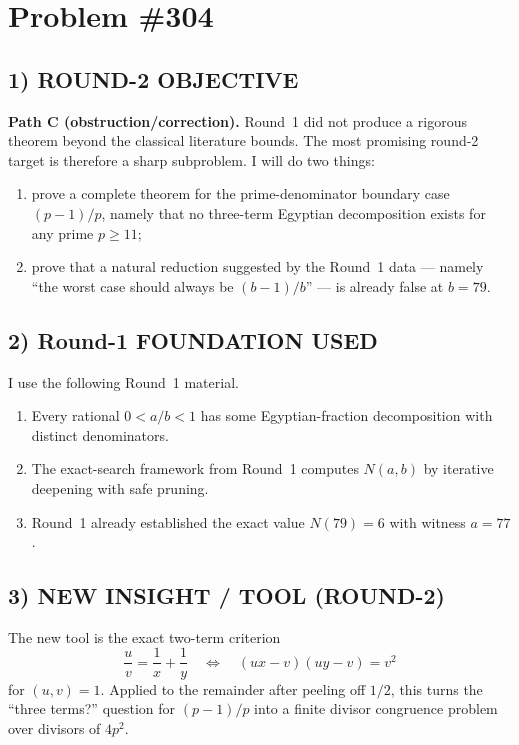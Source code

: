 \section*{Problem \#304}

\subsection*{1) ROUND-2 OBJECTIVE}
\textbf{Path C (obstruction/correction).}
Round~1 did not produce a rigorous theorem beyond the classical literature bounds.
The most promising round-2 target is therefore a sharp subproblem.
I will do two things:
\begin{enumerate}
\item prove a complete theorem for the prime-denominator boundary case \((p-1)/p\), namely that no three-term Egyptian decomposition exists for any prime \(p\ge 11\);
\item prove that a natural reduction suggested by the Round~1 data --- namely ``the worst case should always be \((b-1)/b\)'' --- is already false at \(b=79\).
\end{enumerate}

\subsection*{2) Round-1 FOUNDATION USED}
I use the following Round~1 material.
\begin{enumerate}
\item Every rational \(0<a/b<1\) has some Egyptian-fraction decomposition with distinct denominators.
\item The exact-search framework from Round~1 computes \(N(a,b)\) by iterative deepening with safe pruning.
\item Round~1 already established the exact value \(N(79)=6\) with witness \(a=77\).
\end{enumerate}

\subsection*{3) NEW INSIGHT / TOOL (ROUND-2)}
The new tool is the exact two-term criterion
\[
  \frac{u}{v}=\frac1x+\frac1y
  \quad\Longleftrightarrow\quad
  (ux-v)(uy-v)=v^2
\]
for \((u,v)=1\).
Applied to the remainder after peeling off \(1/2\), this turns the ``three terms?'' question for \((p-1)/p\) into a finite divisor congruence problem over divisors of \(4p^2\).

